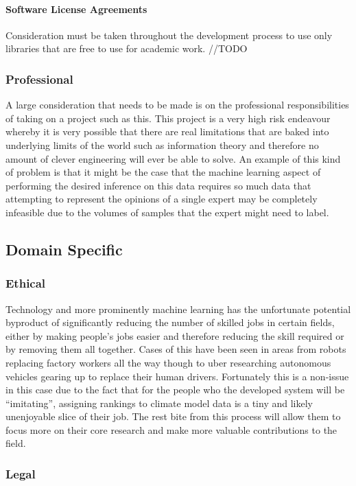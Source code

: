 \documentclass[11pt]{article} %
\numberwithin{equation}{section}
\begin{document}
\paragraph{Software License Agreements}

Consideration must be taken throughout the development process to use
only libraries that are free to use for academic work. //TODO

\subsubsection{Professional}

A large consideration that needs to be made is on the professional
responsibilities of taking on a project such as this. This project
is a very high risk endeavour whereby it is very possible that there
are real limitations that are baked into underlying limits of the world
such as information theory and therefore no amount of clever engineering
will ever be able to solve. An example of this kind of problem is
that it might be the case that the machine learning aspect of performing
the desired inference on this data requires so much data that attempting
to represent the opinions of a single expert may be completely infeasible
due to the volumes of samples that the expert might need to label. 

\subsection{Domain Specific}

\subsubsection{Ethical}

Technology and more prominently machine learning has the unfortunate
potential byproduct of significantly reducing the number of skilled
jobs in certain fields, either by making people's jobs easier and
therefore reducing the skill required or by removing them all together.
Cases of this have been seen in areas from robots replacing factory
workers all the way though to uber researching autonomous vehicles
gearing up to replace their human drivers. Fortunately this is a non-issue
in this case due to the fact that for the people who the developed
system will be ``imitating'', assigning rankings to climate model
data is a tiny and likely unenjoyable slice of their job. The rest bite
from this process will allow them to focus more on their core research
and make more valuable contributions to the field. 

\subsubsection{Legal}
\end{document}
